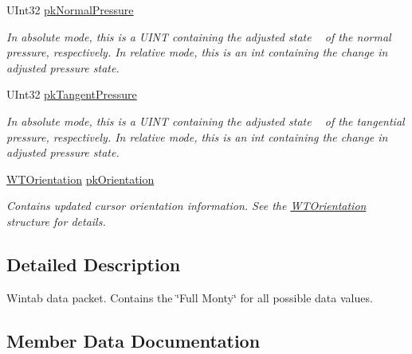 \begin{DoxyCompactItemize}
U\+Int32 \mbox{\hyperlink{struct_wintab_d_n_1_1_wintab_packet_a5fdd43fd4c829d000ed88a12717f1684}{pk\+Normal\+Pressure}}
\begin{DoxyCompactList}\small\item\em In absolute mode, this is a U\+I\+NT containing the adjusted state ~\newline
of the normal pressure, respectively. In relative mode, this is an int containing the change in adjusted pressure state. \end{DoxyCompactList}\item 
U\+Int32 \mbox{\hyperlink{struct_wintab_d_n_1_1_wintab_packet_a32641d97db6e9dcd0fced24782e522af}{pk\+Tangent\+Pressure}}
\begin{DoxyCompactList}\small\item\em In absolute mode, this is a U\+I\+NT containing the adjusted state ~\newline
of the tangential pressure, respectively. In relative mode, this is an int containing the change in adjusted pressure state. \end{DoxyCompactList}\item 
\mbox{\hyperlink{struct_wintab_d_n_1_1_w_t_orientation}{W\+T\+Orientation}} \mbox{\hyperlink{struct_wintab_d_n_1_1_wintab_packet_a78aa4c64fed2484fd43e079dde7a4aaf}{pk\+Orientation}}
\begin{DoxyCompactList}\small\item\em Contains updated cursor orientation information. See the \mbox{\hyperlink{struct_wintab_d_n_1_1_w_t_orientation}{W\+T\+Orientation}} structure for details. \end{DoxyCompactList}\end{DoxyCompactItemize}


\subsection{Detailed Description}
Wintab data packet. Contains the \char`\"{}\+Full Monty\char`\"{} for all possible data values. 



\subsection{Member Data Documentation}
\mbox{\label{struct_wintab_d_n_1_1_wintab_packet_af9d3fe5f03366ce26c3023b7b5ae5fcc}} 
